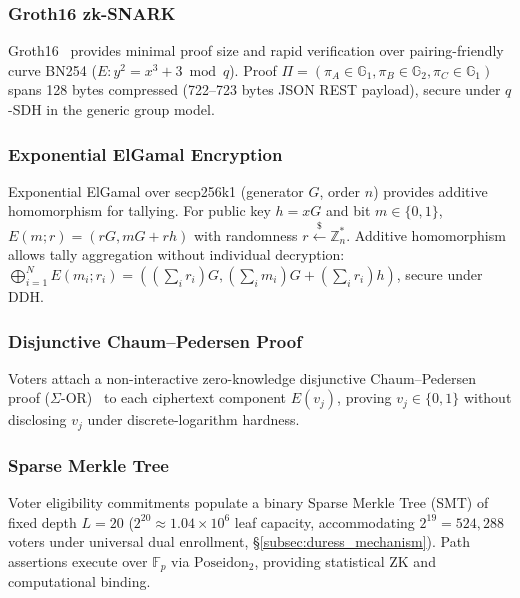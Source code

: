 \documentclass[10pt,letterpaper,journal]{IEEEtran}
\begin{document}
\subsubsection{Groth16 zk-SNARK}
Groth16~\cite{Groth2016} provides minimal proof size and rapid verification over pairing-friendly curve BN254 ($E: y^2 = x^3 + 3 \bmod q$). Proof $\Pi = (\pi_A \in \mathbb{G}_1, \pi_B \in \mathbb{G}_2, \pi_C \in \mathbb{G}_1)$ spans 128 bytes compressed (722--723 bytes JSON REST payload), secure under $q$-SDH in the generic group model.

\subsubsection{Exponential ElGamal Encryption}
Exponential ElGamal over secp256k1 (generator $G$, order $n$) provides additive homomorphism for tallying. For public key $h = xG$ and bit $m \in \{0, 1\}$, $E(m; r) = (rG, mG + rh)$ with randomness $r \xleftarrow{\$} \mathbb{Z}_n^*$. Additive homomorphism allows tally aggregation without individual decryption: $\bigoplus_{i=1}^{N} E(m_i; r_i) = ((\sum_i r_i)G, (\sum_i m_i)G + (\sum_i r_i)h)$, secure under DDH.

\subsubsection{Disjunctive Chaum--Pedersen Proof}
Voters attach a non-interactive zero-knowledge disjunctive Chaum--Pedersen proof ($\Sigma$-OR)~\cite{ChaumPedersen1992} to each ciphertext component $E(v_j)$, proving $v_j \in \{0, 1\}$ without disclosing $v_j$ under discrete-logarithm hardness.

\subsubsection{Sparse Merkle Tree}
Voter eligibility commitments populate a binary Sparse Merkle Tree (SMT) of fixed depth $L = 20$ ($2^{20} \approx 1.04 \times 10^6$ leaf capacity, accommodating $2^{19} = 524{,}288$ voters under universal dual enrollment, \S\ref{subsec:duress_mechanism}). Path assertions execute over $\mathbb{F}_p$ via $\text{Poseidon}_2$, providing statistical ZK and computational binding.
\end{document}

